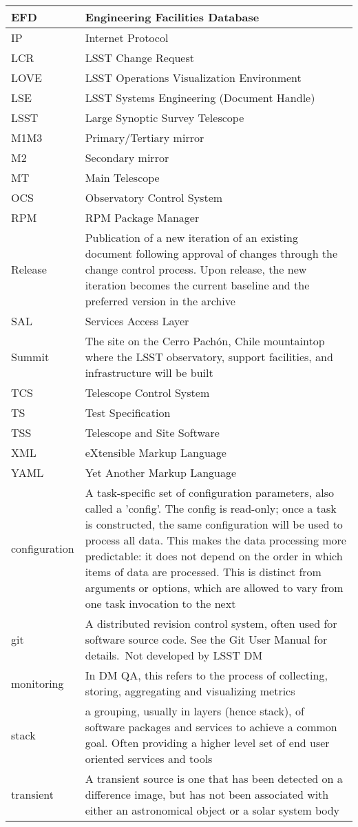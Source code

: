 \begin{longtable}{|p{}|p{}|}
EFD & Engineering Facilities Database \\\hline
IP & Internet Protocol \\\hline
LCR & LSST Change Request \\\hline
LOVE & LSST Operations Visualization Environment \\\hline
LSE & LSST Systems Engineering (Document Handle) \\\hline
LSST & Large Synoptic Survey Telescope \\\hline
M1M3 & Primary/Tertiary mirror \\\hline
M2 & Secondary mirror \\\hline
MT & Main Telescope \\\hline
OCS & Observatory Control System \\\hline
RPM & RPM Package Manager \\\hline
Release & Publication of a new iteration of an existing document following approval of changes through the change control process. Upon release, the new iteration becomes the current baseline and the preferred version in the archive \\\hline
SAL & Services Access Layer \\\hline
Summit & The site on the Cerro Pachón, Chile mountaintop where the LSST observatory, support facilities, and infrastructure will be built \\\hline
TCS & Telescope Control System \\\hline
TS & Test Specification \\\hline
TSS & Telescope and Site Software \\\hline
XML & eXtensible Markup Language \\\hline
YAML & Yet Another Markup Language \\\hline
configuration & A task-specific set of configuration parameters, also called a 'config'. The config is read-only; once a task is constructed, the same configuration will be used to process all data. This makes the data processing more predictable: it does not depend on the order in which items of data are processed. This is distinct from arguments or options, which are allowed to vary from one task invocation to the next \\\hline
git & A distributed revision control system, often used for software source code. See the Git User Manual for details. Not developed by LSST DM \\\hline
monitoring & In DM QA, this refers to the process of collecting, storing, aggregating and visualizing metrics \\\hline
stack & a grouping, usually in layers (hence stack), of software packages and services to achieve a common goal. Often providing a higher level set of end user oriented services and tools \\\hline
transient & A transient source is one that has been detected on a difference image, but has not been associated with either an astronomical object or a solar system body \\\hline
\end{longtable}
